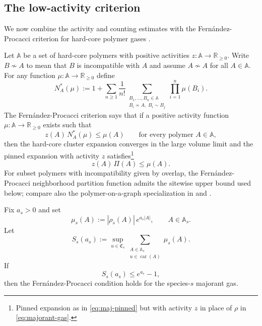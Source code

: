 \documentclass[dvipsnames,a4paper]{article}
\numberwithin{equation}{section}
\theoremstyle{definition}
\theoremstyle{remark}
\begin{document}
\subsection{The low-activity criterion}
\label{sec:low-activity-criterion}

We now combine the activity and counting estimates with the
Fern\'andez-Procacci criterion for hard-core polymer gases
\cite[Theorem~1]{FernandezProcacci2007}.

Let $\mathbb A$ be a set of hard-core polymers with positive activities $z:\mathbb A \to \mathbb R_{\ge 0}$. Write \(B\nsim A\) to mean
that \(B\) is incompatible with \(A\) and assume $A \nsim A$ for all $A \in \mathbb A$. For any function $\mu:\mathbb A \to \mathbb R_{\ge 0}$ define
\begin{equation}
	N_A^*(\mu)
	:=
	1+
	\sum_{n\ge 1}
	\frac{1}{n!}
	\sum_{\substack{B_1,\dots,B_n \in \mathbb A\\
			B_i\nsim A,\;
			B_i\sim B_j}}
	\prod_{i=1}^n \mu(B_i).
	\label{eq:FP-neighborhood}
\end{equation}
The Fern\'andez-Procacci criterion says that if a positive activity function $\mu:\mathbb A \to \mathbb R_{\ge 0}$ exists
such that
\begin{equation}
	z(A)\,N_A^*(\mu)\le \mu(A)
	\qquad
	\text{for every polymer }A \in \mathbb A,
	\label{eq:FP-criterion}
\end{equation}
then the hard-core cluster expansion converges in the large volume limit and the pinned expansion with activity $z$ satisfies\footnote{Pinned expansion as in \eqref{eq:maj-pinned} but with activity $z$ in place of $\rho$ in \eqref{eq:majorant-gas}.}
\begin{equation}
	z(A)\,\Pi(A)\le \mu(A).
	\label{eq:FP-pinned}
\end{equation}
For subset polymers with incompatibility given by overlap, the
Fern\'andez-Procacci neighborhood partition function admits the sitewise upper bound
used below; compare also the polymer-on-a-graph specialization in
\cite[Section~3.2]{FernandezProcacci2007} and
\cite[Section~2.3 and Proposition~4.1]{BissacotFernandezProcacci2010}.

Fix \(a_s>0\) and set
\begin{equation}
	\mu_s(A)
	:=
	|\rho_s(A)|\,e^{a_s|A|},
	\qquad
	A\in\mathbb A_s.
	\label{eq:mu-choice}
\end{equation}
Let
\begin{equation}
	S_s(a_s)
	:=
	\sup_{u\in\mathfrak C_s}
	\sum_{\substack{A\in\mathbb A_s\\ u\in\operatorname{car}(A)}}
	\mu_s(A).
	\label{eq:sitewise-sum}
\end{equation}
If
\begin{equation}
	S_s(a_s)\le e^{a_s}-1,
	\label{eq:sitewise-FP}
\end{equation}
then the Fern\'andez-Procacci condition holds for the species-\(s\) majorant gas.
\end{document}
